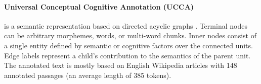 

    





\paragraph{Universal Conceptual Cognitive Annotation (UCCA)} is a semantic representation based on directed acyclic graphs \parencite{abend2013universal}. Terminal nodes can be arbitrary morphemes, words, or multi-word chunks. Inner nodes consist of a single entity defined by semantic or cognitive factors over the connected units. Edge labels represent a child's contribution to the semantics of the parent unit. The annotated text is mostly based on English Wikipedia articles with 148 annotated passages  (an average length of 385 tokens).

